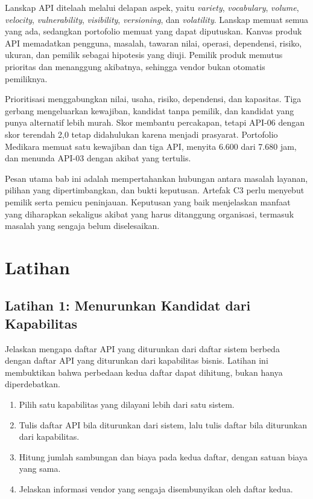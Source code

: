 Lanskap API ditelaah melalui delapan aspek, yaitu \textit{variety}, \textit{vocabulary}, \textit{volume}, \textit{velocity}, \textit{vulnerability}, \textit{visibility}, \textit{versioning}, dan
\textit{volatility}. Lanskap memuat semua yang ada, sedangkan portofolio memuat yang dapat diputuskan. Kanvas produk API memadatkan pengguna, masalah, tawaran nilai, operasi, dependensi, risiko, ukuran, dan pemilik
sebagai hipotesis yang diuji. Pemilik produk memutus prioritas dan menanggung akibatnya, sehingga vendor bukan otomatis pemiliknya.

Prioritisasi menggabungkan nilai, usaha, risiko, dependensi, dan kapasitas. Tiga gerbang mengeluarkan kewajiban, kandidat tanpa pemilik, dan kandidat yang punya alternatif lebih murah. Skor membantu percakapan, tetapi
API-06 dengan skor terendah 2,0 tetap didahulukan karena menjadi prasyarat. Portofolio Medikara memuat satu kewajiban dan tiga API, menyita 6.600 dari 7.680 jam, dan menunda API-03 dengan akibat yang tertulis.

Pesan utama bab ini adalah mempertahankan hubungan antara masalah layanan, pilihan yang dipertimbangkan, dan bukti keputusan. Artefak C3 perlu menyebut pemilik serta pemicu peninjauan. Keputusan yang baik menjelaskan
manfaat yang diharapkan sekaligus akibat yang harus ditanggung organisasi, termasuk masalah yang sengaja belum diselesaikan.

\section{Latihan}

\subsection*{Latihan 1: Menurunkan Kandidat dari Kapabilitas}

Jelaskan mengapa daftar API yang diturunkan dari daftar sistem berbeda dengan daftar API yang diturunkan dari kapabilitas bisnis. Latihan ini membuktikan bahwa perbedaan kedua daftar dapat dihitung, bukan hanya diperdebatkan.
\begin{enumerate}
  \item Pilih satu kapabilitas yang dilayani lebih dari satu sistem.
  \item Tulis daftar API bila diturunkan dari sistem, lalu tulis daftar bila diturunkan dari kapabilitas.
  \item Hitung jumlah sambungan dan biaya pada kedua daftar, dengan satuan biaya yang sama.
  \item Jelaskan informasi vendor yang sengaja disembunyikan oleh daftar kedua.
\end{enumerate}

